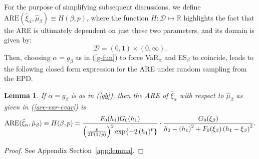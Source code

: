 \documentclass[11pt]{article}
\newcommand{\R}{{\mathbb R}}
\newcommand{\are}{{\text{ARE}}}
\newcommand{\be}{\begin{equation}}
\newcommand{\ee}{\end{equation}}
\newcommand{\B}{\ensuremath{\xi_{\beta}}}
\newcommand{\hvaralph}{\ensuremath{\hat{\xi}_{\alpha}}}
\newcommand{\hcvar}{\ensuremath{\hat{\mu}_{\beta}}}
\newcommand{\al}{\ensuremath{\beta}}
\newcommand{\cb}{\color{blue}}
\newcommand{\nc}{\normalcolor}
\newtheorem{lemma}[theorem]{Lemma}
\begin{document}

For the purpose of simplifying subsequent discussions, we define
$\are(\hvaralph,\hcvar)\equiv H(\beta,p)$, where the function
$H:\mathcal{D}\mapsto\R$ highlights the fact that the ARE is ultimately
dependent on just these two parameters, and its domain is given by:
\be\label{domain-of-H}
\mathcal{D} = (0,1)\times (0,\infty).
\ee  
\nc
Then, choosing $\alpha=g_{\al}$ as in (\ref{g-fun})
to force VaR$_{\alpha}$ and ES$_{\al}$ to coincide, leads to the
following closed form expression for the ARE  under random sampling
from the EPD. 
%
\begin{lemma}\label{lemma:H-fun} 
If $\alpha=g_{\al}$ is as in (\ref{gb}),
then the ARE of $\hvaralph$ with respect to $\hcvar$ as given in (\ref{are-var-cvar})
 is
\be \label{H_2}
\are(\hvaralph,\hcvar) \equiv H(\beta,p)\nc = \frac{F_0(h_1)G_0(h_1)} {\left(\frac{p}{2\Gamma(1/p)}\right)^2\exp\{-2\left(h_1\right)^p\}} 
\cdot \frac{G_0(\B)}{h_2 -\left(h_1\right)^2 + F_0(\B)\left(h_1 -\B \right)^2}.
\ee
\end{lemma}
\begin{proof}
See Appendix Section~\ref{app:lemma}.
\nc
\end{proof}
\end{document}
